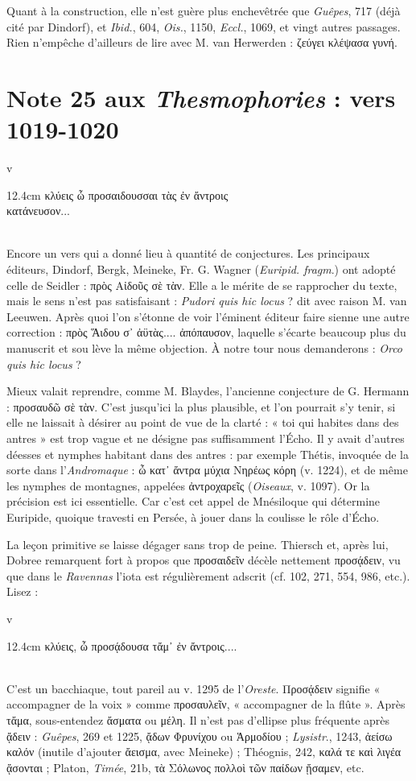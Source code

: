 \documentclass{book}%
\newcommand{\italique}[1]{\textit{#1}}%
\newcommand{\espace}[1]{\hspace{#1}}%
\newcommand{\fantome}{{\color{white}v}}
\newcommand{\Note}[1]{\section*{#1}%
\addcontentsline{toc}{section}{#1}}
\newcommand{\citComm}[1]{\fantome\\
\espace{1cm}\begin{minipagewithmarginpars}{12.4cm}%
#1
\end{minipagewithmarginpars}%
}
\begin{document}
Quant à la construction, elle n'est guère plus enchevêtrée que \italique{Guêpes}, 717 (déjà cité par Dindorf), et \italique{Ibid.}, 604, \italique{Ois.}, 1150, \italique{Eccl.}, 1069, et vingt autres passages. Rien n'empêche d'ailleurs de lire avec M. van Herwerden : ζεύγει κλέψασα γυνή.


\Note{Note 25 aux \italique{Thesmophories} : vers 1019-1020}

\citComm{κλύεις ὦ προσαιδουσσαι τὰς ἐν ἄντροις\\
	κατάνευσον...}\\

Encore un vers qui a donné lieu à quantité de conjectures. Les principaux éditeurs, Dindorf, Bergk, Meineke, Fr. G. Wagner (\italique{Euripid. fragm}.) ont adopté celle de Seidler : πρὸς Αἰδοῦς σὲ τὰν. Elle a le mérite de se rapprocher du texte, mais le sens n'est pas satisfaisant : \italique{Pudori quis hic locus} ? dit avec raison M. van Leeuwen. Après quoi l'on s'étonne de voir l'éminent éditeur faire sienne une autre correction : πρὸς Ἅιδου σ᾽ ἀϋτὰς.... ἀπόπαυσον, laquelle s'écarte beaucoup plus du manuscrit et sou lève la même objection. 
À notre tour nous demanderons : \italique{Orco quis hic locus} ? 

Mieux valait reprendre, comme M. Blaydes, l'ancienne conjecture de G. Hermann : προσαυδῶ σὲ τὰν. C'est jusqu'ici la plus plausible, et l'on pourrait s'y tenir, si elle ne laissait à désirer au point de vue de la clarté : « toi qui habites dans des antres » est trop vague et ne désigne pas suffisamment l'Écho. 
Il y avait d'autres déesses et nymphes habitant dans des antres : par exemple Thétis, invoquée de la sorte dans l'\italique{Andromaque} : ὦ κατ᾽ ἄντρα μύχια Νηρέως κόρη (v. 1224), et de même les nymphes de montagnes, appelées ἀντροχαρεῖς (\italique{Oiseaux}, v. 1097). 
Or la précision est ici essentielle. Car c'est cet appel de Mnésiloque qui détermine Euripide, quoique travesti en Persée, à jouer dans la coulisse le rôle d'Écho. 

La leçon primitive se laisse dégager sans trop de peine. Thiersch et, après lui, Dobree remarquent fort à propos que προσαιδεῖν décèle nettement προσᾴδειν, vu que dans le \italique{Ravennas} l'iota est régulièrement adscrit (cf. 102, 271, 554, 986, etc.). Lisez :

\citComm{κλύεις, ὦ προσᾴδουσα τἄμ᾽ ἐν ἄντροις....}\\

C'est un bacchiaque, tout pareil au v. 1295 de l'\italique{Oreste}. Προσᾴδειν signifie « accompagner de la voix » comme προσαυλεῖν, « accompagner de la flûte ». 
Après τἄμα, sous-entendez ἄσματα ou μέλη. 
Il n'est pas d'ellipse plus fréquente après ᾄδειν : \italique{Guêpes}, 269 et 1225, ᾄδων Φρυνίχου ou Ἁρμοδίου ; \italique{Lysistr}., 1243, ἀείσω καλόν (inutile d'ajouter ἄεισμα, avec Meineke) ; Théognis, 242, καλά τε καὶ λιγέα ᾄσονται ; Platon, \italique{Timée}, 21b, τὰ Σόλωνος πολλοὶ τῶν παίδων ᾔσαμεν, etc.
\end{document}

